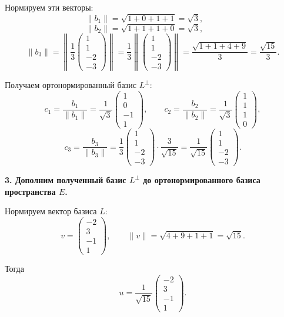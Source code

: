 Нормируем эти векторы:
\[
\|b_1\|=\sqrt{1+0+1+1}=\sqrt3,\qquad
\]
\[
\|b_2\|=\sqrt{1+1+1+0}=\sqrt3,\qquad
\]
\[
\|b_3\|=
\left\|
\frac13
\begin{pmatrix}
1\\
1\\
-2\\
-3
\end{pmatrix}
\right\|
=\frac13
\left\|
\begin{pmatrix}
1\\
1\\
-2\\
-3
\end{pmatrix}
\right\|
=\frac{\sqrt{1+1+4+9}}{3}=\frac{\sqrt{15}}{3}.
\]

Получаем ортонормированный базис $L^\perp$:
\[
c_1=\frac{b_1}{\|b_1\|}
=\frac1{\sqrt3}
\begin{pmatrix}
1\\
0\\
-1\\
1
\end{pmatrix},
\qquad
c_2=\frac{b_2}{\|b_2\|}
=\frac1{\sqrt3}
\begin{pmatrix}
1\\
1\\
1\\
0
\end{pmatrix},
\]
\[
c_3=\frac{b_3}{\|b_3\|}
=\frac13
\begin{pmatrix}
1\\
1\\
-2\\
-3
\end{pmatrix}
\cdot\frac3{\sqrt{15}}
=\frac1{\sqrt{15}}
\begin{pmatrix}
1\\
1\\
-2\\
-3
\end{pmatrix}.
\]

\bigskip

\textbf{3. Дополним полученный базис $L^\perp$ до ортонормированного базиса пространства $E$.}

Нормируем вектор базиса $L$:
\[
v=
\begin{pmatrix}
-2\\
3\\
-1\\
1
\end{pmatrix},
\qquad
\|v\|=\sqrt{4+9+1+1}=\sqrt{15}.
\]

Тогда
\[
u=\frac1{\sqrt{15}}
\begin{pmatrix}
-2\\
3\\
-1\\
1
\end{pmatrix}.
\]

